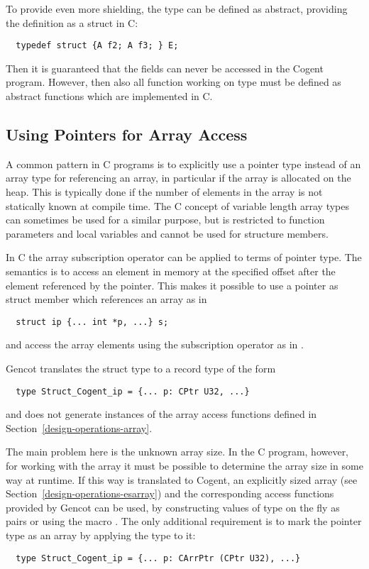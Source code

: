 To provide even more shielding, the type  can be defined as abstract, providing the definition
as a struct in C:
\begin{verbatim}
  typedef struct {A f2; A f3; } E;
\end{verbatim}
Then it is guaranteed that the fields can never be accessed in the Cogent program. However, then also 
all function working on type  must be defined as abstract functions which are implemented in C.

\subsection{Using Pointers for Array Access}
\label{app-transtype-arrpoint}

A common pattern in C programs is to explicitly use a pointer type instead of an array type for referencing an array,
in particular if the array is allocated on the heap. This is typically done if the number of elements in the
array is not statically known at compile time. The C concept of variable length array types can sometimes be
used for a similar purpose, but is restricted to function parameters and local variables and cannot be used for
structure members.

In C the array subscription operator can be applied to terms of pointer type. The semantics is to access an element 
in memory at the specified offset after the element referenced by the pointer. This makes it possible to use 
a pointer as struct member which references an array as in
\begin{verbatim}
  struct ip {... int *p, ...} s;
\end{verbatim}
and access the array elements using the subscription operator as in .

Gencot translates the struct type to a record type of the form
\begin{verbatim}
  type Struct_Cogent_ip = {... p: CPtr U32, ...}
\end{verbatim}
and does not generate instances of the array access functions defined in Section~\ref{design-operations-array}. 

The main problem here is the unknown array size. In the C program, however, for working with the array it must be
possible to determine the array size in some way at runtime. If this way is translated to Cogent, an explicitly
sized array (see Section~\ref{design-operations-esarray}) and the corresponding access functions provided by
Gencot can be used, by constructing values of type  on the fly as pairs 
or using the macro . The only additional requirement is to mark the pointer type as an array by
applying the type  to it:
\begin{verbatim}
  type Struct_Cogent_ip = {... p: CArrPtr (CPtr U32), ...}
\end{verbatim}


